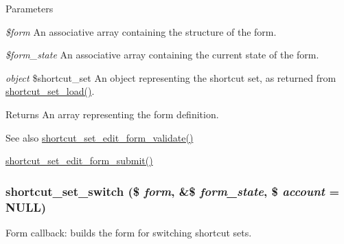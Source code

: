 \begin{DoxyParams}{Parameters}
\item[{\em \$form}]An associative array containing the structure of the form. \item[{\em \$form\_\-state}]An associative array containing the current state of the form. \item[{\em object}]\$shortcut\_\-set An object representing the shortcut set, as returned from \hyperlink{shortcut_8module_a66161b6ac12978c1a31bb5c5bf27dc65}{shortcut\_\-set\_\-load()}.\end{DoxyParams}
\begin{DoxyReturn}{Returns}
An array representing the form definition.
\end{DoxyReturn}
\begin{DoxySeeAlso}{See also}
\hyperlink{shortcut_8admin_8inc_ad666de226110fe05591951034928b39d}{shortcut\_\-set\_\-edit\_\-form\_\-validate()} 

\hyperlink{shortcut_8admin_8inc_a0dd86009f508e3643d35aa46d9c454ca}{shortcut\_\-set\_\-edit\_\-form\_\-submit()} 
\end{DoxySeeAlso}
\hypertarget{group__forms_ga9ec510e2dad9820993309247e6a50bd7}{
\subsubsection[{shortcut\_\-set\_\-switch}]{\setlength{\rightskip}{0pt plus 5cm}shortcut\_\-set\_\-switch (\$ {\em form}, \/  \&\$ {\em form\_\-state}, \/  \$ {\em account} = {\ttfamily NULL})}}
\label{group__forms_ga9ec510e2dad9820993309247e6a50bd7}
Form callback: builds the form for switching shortcut sets.


